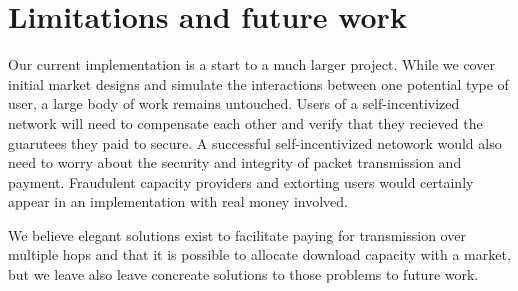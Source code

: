 \section{Limitations and future work}
\label{sec:limits}
Our current implementation is a start to a much larger project. While we cover initial market designs and simulate the interactions between one potential type of user, a large body of work remains untouched.
Users of a self-incentivized network will need to compensate each other and verify that they recieved the guarutees they paid to secure.
A successful self-incentivized netowork would also need to worry about the security and integrity of packet transmission and payment. Fraudulent capacity providers and extorting users would certainly appear in an implementation with real money involved.

We believe elegant solutions exist to facilitate paying for transmission over multiple hops and that it is possible to allocate download capacity with a market, but we leave also leave concreate solutions to those problems to future work.
